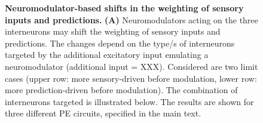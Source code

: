 \documentclass[10pt,a4paper,draft]{article}
\begin{document}
\begin{figure}[t!]
	\centering
\caption{\footnotesize{\bf Neuromodulator-based shifts in the weighting of sensory inputs and predictions.
\newline} 
{\bf (A)} Neuromodulators acting on the three interneurons may shift the weighting of sensory inputs and predictions. The changes depend on the type/s of interneurons targeted by the additional excitatory input emulating a neuromodulator (additional input = XXX). Considered are two limit cases (upper row: more sensory-driven before modulation, lower row: more prediction-driven before modulation). The combination of interneurons targeted is illustrated below. The results are shown for three different PE circuits, specified in the main text. 
}
\end{figure}
\end{document}
